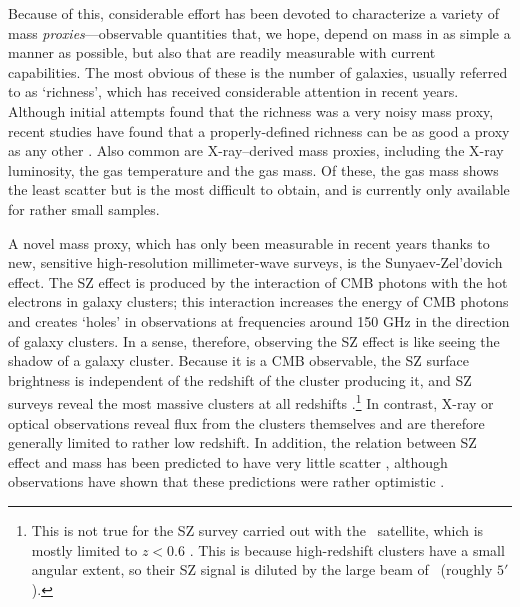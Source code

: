 Because of this, considerable effort has been devoted to characterize a variety of mass \emph{proxies}---observable quantities that, we hope, depend on mass in as simple a manner as possible, but also that are readily measurable with current capabilities. The most obvious of these is the number of galaxies, usually referred to as `richness', which has received considerable attention in recent years. Although initial attempts found that the richness was a very noisy mass proxy, recent studies have found that a properly-defined richness can be as good a proxy as any other \citep{rykoff12,andreon15}. Also common are X-ray--derived mass proxies, including the X-ray luminosity, the gas temperature and the gas mass. Of these, the gas mass shows the least scatter \citep{mahdavi13} but is the most difficult to obtain, and is currently only available for rather small samples.

A novel mass proxy, which has only been measurable in recent years thanks to new, sensitive high-resolution millimeter-wave surveys, is the Sunyaev-Zel'dovich \citep[SZ,][]{sunyaev72} effect.
The SZ effect is produced by the interaction of CMB photons with the hot electrons in galaxy clusters; this interaction increases the energy of CMB photons and creates `holes' in observations at frequencies around 150 GHz in the direction of galaxy clusters. In a sense, therefore, observing the SZ effect is like seeing the shadow of a galaxy cluster. Because it is a CMB observable, the SZ surface brightness is independent of the redshift of the cluster producing it, and SZ surveys reveal the most massive clusters at all redshifts \citep{hasselfield13,bleem15}.\footnote{This is not true for the SZ survey carried out with the \planck\ satellite, which is mostly limited to $z<0.6$ \citep{planck15xxvii}. This is because high-redshift clusters have a small angular extent, so their SZ signal is diluted by the large beam of \planck\ (roughly $5'$).} In contrast, X-ray or optical observations reveal flux from the clusters themselves and are therefore generally limited to rather low redshift. In addition, the relation between SZ effect and mass has been predicted to have very little scatter \citep[at a level of 5--10\%; e.g.,][]{motl05,battaglia12}, although observations have shown that these predictions were rather optimistic \citep{benson13,sifon13}.


